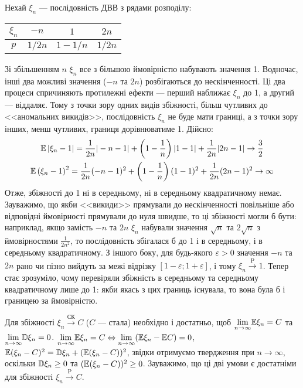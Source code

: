 \begin{example}
    Нехай $\xi_n$ --- послідовність ДВВ з рядами розподілу:
    \begin{center}
        \begin{tabular}{|c|c|c|c|}
            \hline
            $\xi_n$ & $-n$ & $1$ & $2n$ \\
            \hline
            $p$ & $1/{2n}$ & $1 - 1/n$ & $1/{2n}$ \\
            \hline
        \end{tabular}
    \end{center}
    Зі збільшенням $n$ $\xi_n$ все з більшою ймовірністю набувають значення 1. 
    Водночас, інші два можливі значення ($-n$ та $2n$) розбігаються до нескінченності. 
    Ці два процеси спричиняють протилежні ефекти --- перший наближає $\xi_n$ до 1, а другий --- віддаляє. 
    Тому з точки зору одних видів збіжності, більш чутливих до <<аномальних викидів>>, послідовність $\xi_n$ не буде мати границі, 
    а з точки зору інших, менш чутливих, границя дорівнюватиме 1.
    Дійсно: 
    \begin{gather*}
        \mathbb{E}\left|\xi_n -1 \right| = \frac{1}{2n} |-n-1|  + \left( 1 - \frac{1}{n}\right)|1-1| + \frac{1}{2n}|2n-1| \to \frac{3}{2} \\
        \mathbb{E}\left(\xi_n -1 \right)^2 = \frac{1}{2n} (-n-1)^2  + \left( 1 - \frac{1}{n}\right)(1-1)^2 + \frac{1}{2n}(2n-1)^2 \to \infty
    \end{gather*}
    Отже, збіжності до 1 ні в середньому, ні в середньому квадратичному немає. Зауважимо, що якби <<викиди>> прямували до нескінченності повільніше або відповідні
    ймовірності прямували до нуля швидше, то ці збіжності могли б бути: наприклад, якщо замість $-n$ та $2n$ $\xi_n$ набували значення $\sqrt{n}$ та $2\sqrt{n}$
    з ймовірностями $\frac{1}{2n^2}$, то послідовність збігалася б до 1 і в середньому, і в середньому квадратичному.
    З іншого боку, для будь-якого $\varepsilon>0$ значення $-n$ та $2n$ рано чи пізно вийдуть за межі відрізку $[1-\varepsilon;1+\varepsilon]$, і тому
    $\xi_n \overset{\mathrm{P}}{\longrightarrow} 1$. Тепер стає зрозуміло, чому перевіряли збіжність в середньому та середньому квадратичному лише до 1: якби
    якась з цих границь існувала, то вона була б і границею за ймовірністю.
\end{example}
\begin{remark}Для збіжності $\xi_n \overset{\text{СК}}{\longrightarrow} C$ ($C$ --- стала) необхідно і достатньо, щоб
$\underset{n \to \infty}{\lim} \mathbb{E}\xi_n = C$ та $\underset{n \to \infty}{\lim} \mathbb{D}\xi_n = 0$.
$\underset{n \to \infty}{\lim} \mathbb{E}\xi_n = C \Leftrightarrow \underset{n \to \infty}{\lim} (\mathbb{E}\xi_n - \mathbb{E} C) = 0$,
$\mathbb{E}(\xi_n - C)^2 = \mathbb{D}\xi_n + (\mathbb{E}(\xi_n -C))^2$,
звідки отримуємо твердження при $n \to \infty$, оскільки $\mathbb{D}\xi_n \geq 0$ та $(\mathbb{E}(\xi_n -C))^2 \geq 0$.
Зауважимо, що ці дві умови є достатніми для збіжності $\xi_n \overset{\mathrm{P}}{\longrightarrow} C$.
\end{remark}
